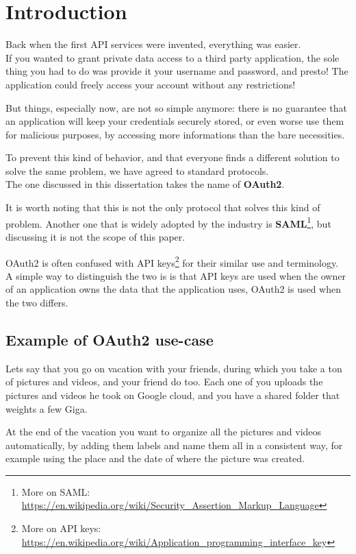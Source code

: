 \section{Introduction}
Back when the first API services were invented, everything was easier.
\\
If you wanted to grant private data access to a third party application,
the sole thing you had to do was provide it your username and password, and
presto!
The application could freely access your account without any restrictions!

But things, especially now, are not so simple anymore: there is no guarantee
that an application will keep your credentials securely stored, or even worse
use them for malicious purposes, by accessing more informations than the bare
necessities.

To prevent this kind of behavior, and that everyone finds a different solution
to solve the same problem, we have agreed to standard protocols.
\\
The one discussed in this dissertation takes the name of \textbf{OAuth2}.

It is worth noting that this is not the only protocol that solves this kind of problem.
Another one that is widely adopted by the industry is \textbf{SAML}\footnote{More on SAML: \url{https://en.wikipedia.org/wiki/Security_Assertion_Markup_Language}},
but discussing it is not the scope of this paper.


OAuth2 is often confused with API keys\footnote{More on API keys:
\url{https://en.wikipedia.org/wiki/Application\_programming\_interface\_key}}
%
for their similar use and terminology.
\\
A simple way to distinguish the two is
is that API keys are used when the owner of an application owns the data that
the application uses, OAuth2 is used when the two differs.

\subsection{Example of OAuth2 use-case}

Lets say that you go on vacation with your friends, during which you take a ton
of pictures and videos, and your friend do too.
Each one of you uploads the pictures and videos he took on Google cloud, and
you have a shared folder that weights a few Giga.

At the end of the vacation you want to organize all the pictures and videos
automatically, by adding them labels and name them all in a consistent way, for
example using the place and the date of where the picture was created.

